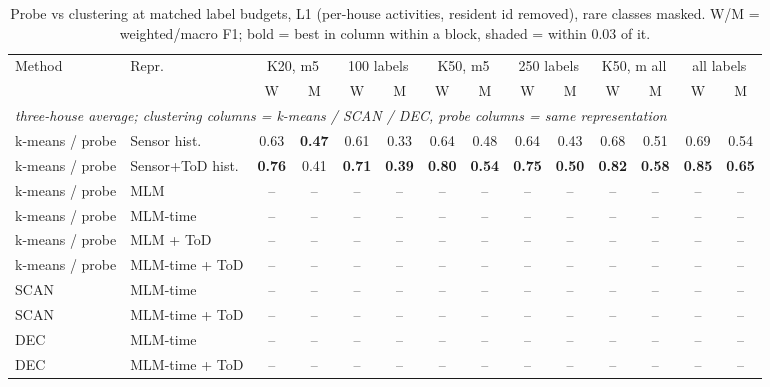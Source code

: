 \begin{table}[H]
\centering\small
\caption{Probe vs clustering at matched label budgets, L1 (per-house activities, resident id removed), rare classes masked. W/M = weighted/macro F1; bold = best in column within a block, shaded = within 0.03 of it.}
\label{tab:cmp_l1_masked}
\setlength{\tabcolsep}{3.5pt}
\begin{tabular}{llcc|cc|cc|cc|cc|cc}
\toprule
Method & Repr. & \multicolumn{2}{c}{K20, m5} & \multicolumn{2}{c}{100 labels} & \multicolumn{2}{c}{K50, m5} & \multicolumn{2}{c}{250 labels} & \multicolumn{2}{c}{K50, m all} & \multicolumn{2}{c}{all labels} \\
\cmidrule(lr){3-4}\cmidrule(lr){5-6}\cmidrule(lr){7-8}\cmidrule(lr){9-10}\cmidrule(lr){11-12}\cmidrule(lr){13-14}
 & & W & M & W & M & W & M & W & M & W & M & W & M \\
\midrule
\multicolumn{14}{l}{\textit{three-house average; clustering columns = k-means / SCAN / DEC, probe columns = same representation}} \\
\midrule
k-means / probe & Sensor hist. & 0.63 & \cellcolor{blue!12}\textbf{0.47} & 0.61 & 0.33 & 0.64 & 0.48 & 0.64 & 0.43 & 0.68 & 0.51 & 0.69 & 0.54 \\
k-means / probe & Sensor+ToD hist. & \cellcolor{blue!12}\textbf{0.76} & 0.41 & \cellcolor{blue!12}\textbf{0.71} & \cellcolor{blue!12}\textbf{0.39} & \cellcolor{blue!12}\textbf{0.80} & \cellcolor{blue!12}\textbf{0.54} & \cellcolor{blue!12}\textbf{0.75} & \cellcolor{blue!12}\textbf{0.50} & \cellcolor{blue!12}\textbf{0.82} & \cellcolor{blue!12}\textbf{0.58} & \cellcolor{blue!12}\textbf{0.85} & \cellcolor{blue!12}\textbf{0.65} \\
\cmidrule{1-14}
k-means / probe & MLM & -- & -- & -- & -- & -- & -- & -- & -- & -- & -- & -- & -- \\
k-means / probe & MLM-time & -- & -- & -- & -- & -- & -- & -- & -- & -- & -- & -- & -- \\
k-means / probe & MLM + ToD & -- & -- & -- & -- & -- & -- & -- & -- & -- & -- & -- & -- \\
k-means / probe & MLM-time + ToD & -- & -- & -- & -- & -- & -- & -- & -- & -- & -- & -- & -- \\
\cmidrule{1-14}
SCAN & MLM-time & -- & -- & -- & -- & -- & -- & -- & -- & -- & -- & -- & -- \\
SCAN & MLM-time + ToD & -- & -- & -- & -- & -- & -- & -- & -- & -- & -- & -- & -- \\
\cmidrule{1-14}
DEC & MLM-time & -- & -- & -- & -- & -- & -- & -- & -- & -- & -- & -- & -- \\
DEC & MLM-time + ToD & -- & -- & -- & -- & -- & -- & -- & -- & -- & -- & -- & -- \\
\bottomrule
\end{tabular}
\end{table}

